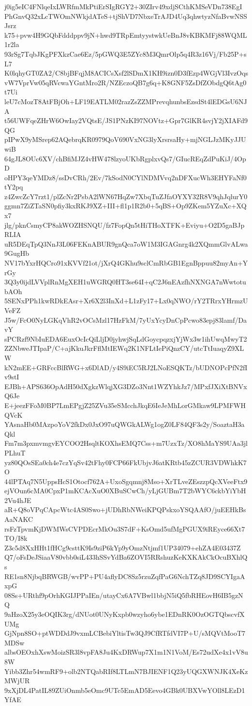 j0ig5eIC4FNlqeIxLWRfmMkPtiErSIgRGY2+30ZIrv49xdjSCthKMSeVDn738EgI
PhGnvQ32xLcTWOmNWkjdATeS+tjShVD7NbxeTrAJD4Uq3qhwtyzNfaBvwNSSJsrz
k75+pvw4H9GQbFdddppv9jN+hwd9TRpEmtyystwkUeBnJ8vKBKMFj88WQML1r2la
93rSg7TqbJKgPFXkzCae6Ez/5pGWQ3E5ZYc8M3QmrOlp5q4R3z16Vj/Fb25P+sL7
K0lqhyGT0ZA2/C8bjBFqjM8ACICsXsf2lSDmX1KH9izn0D3fEzp4WGjVl3IvzOqs
vW7VprVw05qRVcwaYGntMro2R/NZEczoQB7g6q+K8GNF5ZsDfZObdgQ6tAg0t7Ui
leU7cMozT8AtFBjOh+LF19EATLM02razZsZZMPrevqhunbsEzsdSt4lEDGsU6NJA
t56UWFqeZHrW6OwIay2VQtsE/JS1PNzKI97NOVtz+Gpr7GlKR4svjY2jXIAFd9QG
pIPwX9yMSrep62AQebrqKR0979QoV690VxNG3lyXrsrsaHy+mjNGLJzMKyJJUwiB
64gJL8OUc6XV/chBfiMJZ4vHW478lzyoUKbRgplxvQs7/GIucREqZdPuKiJ/4OpD
oHPY3qeYMDz8/ssDvCRh/2Ev/7kSodN0CYlNDMVvq2nDFXucWh3EHYFaNf0tY2pq
z4ZwcZcY7rzt1/plZcNr2PsbA2lWN67HqZw7XbqTuZJfaOYXY32R8V9qhJqlurY0
ggmn7ZiZTaSN0pfiy3kxRKJ9XZ+III+fl1p1R2b0+5qBS+Op9ZKem5YZuXc+XQx7
jlg/pknCsmyCP8akWOZHSNQU/fz7FopQn5tHiTHoXTFK+Eviyu+O2D5gaBJpRLIA
uR5DEqTpQ3NnJ3L06FEKnABUR9gnQca7oW1M3IGAGnrg4k2XQmmGlvALwa9GugHb
NV17bYxrHQCro91xKVVf21ot/jXrQ4GKhu9sclCmRbGB1EgnBppuu82myAn+YrGy
3Q3y0ijdLVVplRnMgXEH1uWGRQ0HT3se64I+qC2J6nEAzfhNXNGA7nWwtotubAOh
5SENxPPh1kwRDkEAsr+Xr6X2l3InXd+L1zFy17+Lx0qNWO/rY2TRrxYHrmzUVeFZ
J5w/FcO0NyLGKqVhR2vOCsMzl17HzFkM/7yUxYcyDnCpPcwo83epj83lamf/DavY
sPCRzf9NbIuEDA6EuxOcIcQiLljD0jyhwjSqLdGoycpqzxjYjWx3w1ihUwqMwyT2
ZZNbweJTIpaP/C+ajKkuJkrFflMtIEWq2K1NFLtIePiQnzCY/utcTtIuaqyZ9XLW
kN2mEE+GRFccBlRWG+x6DlAD/y4S9iEC5RJ2LNoESQKTz/bUDNOPcPfN2fIv9stI
EJBh+APS636OpAdH50dXgkzWlqjXG3DZo3Nnt1WZYhkJz7/MPxfJXiXtBNVxQ6Je
E+jeezFFoM0BP7LmEPgjZ25ZVu35eSMcchJkqE6IeJeMhLorGMkaw9LPMFWHQVcK
YAsnaHb0MAzpoYoV2fkDx0JxO97uQWGkALWg1ogZ0LF84QF3s2y/SoaztaH3aQkl
Fm7m3pxmvmgvEYCOO2HsqltKOXhsEMQ7Css+m7UzxTz/XO8hMaYS9UAa3jlPLhuT
yz80QOsSEa0ch4e7czYqSv42tFhy0FCP66FkUbjvJ6atKRtb45zZCUR3VDWhkK7O
44lPTAq7N5UppsHcS1Otocf762A+UxoSgqmnj8Mso+XrTLveZEszzpQcXVeeFtx9
ejVOun6cMA0CpxP1mKCAcXuO0XBuSCwCh/yLjGUBm7T2bWYC6ckbYiYbH2Vu4hJE
aR+Q8oVPqCApcWtc4AS0Swo+jUDhRbNWeiKPQPskxoYSQAAfO/juEEHkBsAaNAKC
rsFzTpvmKjDWMWsCVPDEcrMkOu3S7dF+KsOmd5ufMgPGUX9iREyce66Xt7TO/I8k
Z3c5d8XxHHt1fHCg9csttK9Is9ziP6kYp9yOmzNtjmf1UP34079+ehZA4E03437Z
Q7/oFsDeJSiaaV80vbb0siL433hSSvYdBa6ZOVI5RRshuzKeKXKAkCkOcuBXhlQs
RE1sn8NjbqBRWGB/wvPP+PU4aflyDC8Sz5rzuZqfPaG6NchTZq8JD9SCYIgaAxpG
08Ss+URthf9pOrhKGIJPPaIEn/utayCx6A7VBwl1bbjN5iQ5fbRHEovH6IB5gzNQ
9aHzoX25y3eOQIK3rg/dNUot0UNyKxpb0wzyho6ybe1EDnRK0OzOGTQbscvfXUMg
GjNpn8SO+ptWDDdJ9vxmLCBebiYltisTw3QJ9CfRTfdVI7P+U/sMQVtMooT7MDSw
albsOEOxhXswMoizSR3l8vpFA8Ju4KxDRWup7X1m1N1VoM/Es72udXe4x1vV8u8W
Yibb3Zhr54wmRF9+olb2NTQabRIf8LTLmN7BJIENF1Q23yUQGXWNJK4XeKzMWjUR
9xXjDL4PatIL89ZUiOnmb5eOmc9UTc5EmAD5Eevo4GBk0UBXVwYOll8LEzD1YfAE

